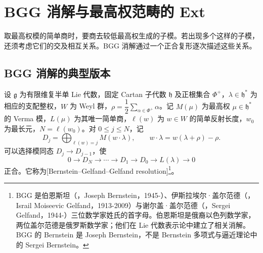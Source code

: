 
\section{BGG 消解与最高权范畴的 Ext}
\label{b5:sec:2004}

%
%

取最高权模的简单商时，要商去较低最高权生成的子模。若出现多个这样的子模，还须考虑它们的交及相互关系。BGG 消解通过一个正合复形逐次描述这些关系。

\subsection{BGG 消解的典型版本}
\label{b5:subsec:2004:01}

\begin{theorem}[BGG 消解]\label{b5:thm:bgg-resolution}
	设 \(\mathfrak g\) 为有限维复半单 Lie 代数，固定 Cartan 子代数 \(\mathfrak h\) 及正根集合 \(\Phi^+\)，\(\lambda\in\mathfrak h^*\) 为相应的支配整权，\(W\) 为 Weyl 群，\(\rho=\dfrac12\sum_{\alpha\in\Phi^+}\alpha\)。记 \(M(\mu)\) 为最高权 \(\mu\in\mathfrak h^*\) 的 Verma 模，\(L(\mu)\) 为其唯一简单商，\(\ell(w)\) 为 \(w\in W\) 的简单反射长度，\(w_0\) 为最长元，\(N=\ell(w_0)\)。对 \(0\le j\le N\)，记
	\[
		D_j=\bigoplus_{\ell(w)=j}M(w\mathbin{\cdot}\lambda), \qquad w\mathbin{\cdot}\lambda=w(\lambda+\rho)-\rho.
	\]
	可以选择模同态 \(D_j\to D_{j-1}\)，使
	\[
		0\longrightarrow D_N\longrightarrow\cdots\longrightarrow D_1 \longrightarrow D_0\longrightarrow L(\lambda)\longrightarrow0
	\]
	正合。它称为[Bernstein--Gelfand--Gelfand resolution]\footnote{BGG 是伯恩斯坦（，Joseph Bernstein，1945-）、伊斯拉埃尔·盖尔范德（，Israil Moiseevic Gelfand，1913-2009）与谢尔盖·盖尔范德（，Sergei Gelfand，1944-）三位数学家姓氏的首字母。伯恩斯坦是俄裔以色列数学家，两位盖尔范德是俄罗斯数学家；他们在 Lie 代数表示论中建立了相关消解。BGG 的 Bernstein 是 Joseph Bernstein，不是 Bernstein 多项式与逼近理论中的 Sergei Bernstein。}。
\end{theorem}

